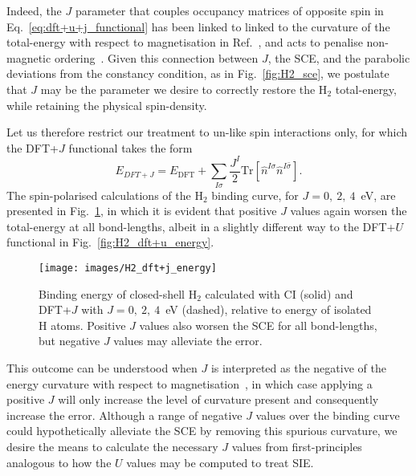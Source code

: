 {%
Indeed, 
the $J$ parameter that couples occupancy matrices 
of opposite spin in Eq.~\eqref{eq:dft+u+j_functional} 
has been linked to linked to the curvature 
of the total-energy with respect to magnetisation 
in Ref.~\cite{PhysRevB.84.115108}, 
and acts to penalise non-magnetic 
ordering~\cite{PhysRevB.79.035103,PhysRevB.84.115108}.
%
Given this connection between $J$, the SCE, 
and the parabolic deviations from 
the constancy condition, 
as in Fig.~\ref{fig:H2_sce},
we postulate that $J$ may be the parameter we desire   
to correctly restore the H$_2$ total-energy, 
while retaining the physical spin-density.

Let us therefore restrict our treatment to 
un-like spin interactions only, 
for which the DFT+$J$ functional 
takes the form 
%
\begin{equation}
E_{DFT+J}
=E_\textrm{DFT}
+\sum_{I\sigma}\frac{J^I}{2}\textrm{Tr}\left[\hat{n}^{I\sigma}\hat{n}^{I\bar\sigma}\right].
\label{eq:dft+j_functional} 
\end{equation}
%
The spin-polarised calculations 
of the H$_2$ binding curve, 
for $J=0,\ 2,\ 4$~eV, 
are presented in Fig.~\ref{fig:H2_dft+j_energy}, 
in which it is evident 
that positive $J$ values again 
worsen the total-energy at all bond-lengths, 
albeit in a slightly different way 
to the DFT+$U$ functional in Fig.~\ref{fig:H2_dft+u_energy}.
%

\begin{figure}[th!]
\centering
\texttt{[image: images/H2\_dft+j\_energy]}
\caption[Binding energy curve of H$_2$ with DFT+$J$]
{Binding energy of {closed-shell} H$_2$ 
calculated with CI (solid) and 
DFT+$J$ with $J=0,\ 2,\ 4$~eV (dashed), 
relative to energy of isolated H atoms.
%
Positive $J$ values also worsen the SCE 
for all bond-lengths, but negative $J$ 
values may alleviate the error.}
\label{fig:H2_dft+j_energy}
\end{figure}

{This outcome can be understood 
when $J$ is interpreted as the negative of 
the energy curvature with respect to magnetisation~\cite{PhysRevB.84.115108},
in which case applying a positive $J$ will only increase 
the level of curvature present and 
consequently increase the error.}
%
Although a range of negative $J$ values
over the binding curve could hypothetically  
alleviate the SCE {by removing this spurious curvature}, 
we desire the means to calculate the 
necessary $J$ values from first-principles 
analogous to how the $U$ values may be 
computed to treat SIE.

}
